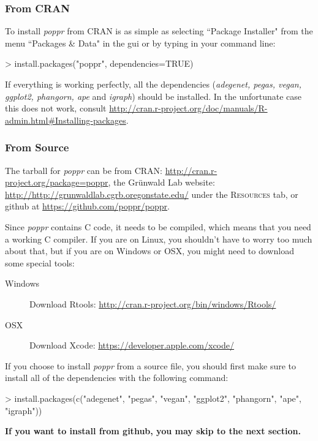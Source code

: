 \documentclass[letterpaper]{article}
\newcommand{\tab}{\hspace*{1em}}
\begin{document}
\subsubsection{From CRAN}
\tab\tab To install \textit{poppr} from CRAN is as simple as selecting ``Package Installer" from the menu ``Packages \& Data" in the gui or by typing in your command line:
\begin{Schunk}
\begin{Sinput}
> install.packages("poppr", dependencies=TRUE)
\end{Sinput}
\end{Schunk}
If everything is working perfectly, all the dependencies (\textit{adegenet, pegas, vegan, ggplot2, phangorn, ape} and \textit{igraph}) should be installed. In the unfortunate case this does not work, consult \url{http://cran.r-project.org/doc/manuals/R-admin.html#Installing-packages}.

\subsubsection{From Source}
\tab\tab The tarball for \textit{poppr} can be from CRAN: \url{http://cran.r-project.org/package=poppr}, the Gr\"unwald Lab website: \url{http://http://grunwaldlab.cgrb.oregonstate.edu/} under the \textsc{Resources} tab, or github at \url{https://github.com/poppr/poppr}. 

Since \textit{poppr} contains C code, it needs to be compiled, which means that you need a working C compiler. If you are on Linux, you shouldn't have to worry too much about that, but if you are on Windows or OSX, you might need to download some special tools:

\begin{description}
  \item[Windows] Download Rtools: \url{http://cran.r-project.org/bin/windows/Rtools/}
  \item[OSX] Download Xcode: \url{https://developer.apple.com/xcode/}
\end{description}

If you choose to install \textit{poppr} from a source file, you should first make sure to install all of the dependencies with the following command:
\begin{Schunk}
\begin{Sinput}
> install.packages(c("adegenet", "pegas", "vegan", "ggplot2", "phangorn", "ape", "igraph"))
\end{Sinput}
\end{Schunk}
\textbf{If you want to install from github, you may skip to the next section.}
\end{document}
